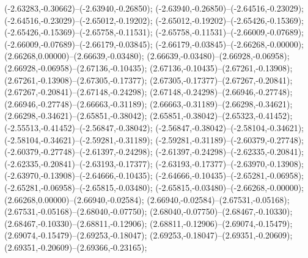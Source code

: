  (-2.63283,-0.30662)--(-2.63940,-0.26850);
 (-2.63940,-0.26850)--(-2.64516,-0.23029);
 (-2.64516,-0.23029)--(-2.65012,-0.19202);
 (-2.65012,-0.19202)--(-2.65426,-0.15369);
 (-2.65426,-0.15369)--(-2.65758,-0.11531);
 (-2.65758,-0.11531)--(-2.66009,-0.07689);
 (-2.66009,-0.07689)--(-2.66179,-0.03845);
 (-2.66179,-0.03845)--(-2.66268,-0.00000);
 (2.66268,0.00000)--(2.66639,-0.03480);
 (2.66639,-0.03480)--(2.66928,-0.06958);
 (2.66928,-0.06958)--(2.67136,-0.10435);
 (2.67136,-0.10435)--(2.67261,-0.13908);
 (2.67261,-0.13908)--(2.67305,-0.17377);
 (2.67305,-0.17377)--(2.67267,-0.20841);
 (2.67267,-0.20841)--(2.67148,-0.24298);
 (2.67148,-0.24298)--(2.66946,-0.27748);
 (2.66946,-0.27748)--(2.66663,-0.31189);
 (2.66663,-0.31189)--(2.66298,-0.34621);
 (2.66298,-0.34621)--(2.65851,-0.38042);
 (2.65851,-0.38042)--(2.65323,-0.41452);
 (-2.55513,-0.41452)--(-2.56847,-0.38042);
 (-2.56847,-0.38042)--(-2.58104,-0.34621);
 (-2.58104,-0.34621)--(-2.59281,-0.31189);
 (-2.59281,-0.31189)--(-2.60379,-0.27748);
 (-2.60379,-0.27748)--(-2.61397,-0.24298);
 (-2.61397,-0.24298)--(-2.62335,-0.20841);
 (-2.62335,-0.20841)--(-2.63193,-0.17377);
 (-2.63193,-0.17377)--(-2.63970,-0.13908);
 (-2.63970,-0.13908)--(-2.64666,-0.10435);
 (-2.64666,-0.10435)--(-2.65281,-0.06958);
 (-2.65281,-0.06958)--(-2.65815,-0.03480);
 (-2.65815,-0.03480)--(-2.66268,-0.00000);
 (2.66268,0.00000)--(2.66940,-0.02584);
 (2.66940,-0.02584)--(2.67531,-0.05168);
 (2.67531,-0.05168)--(2.68040,-0.07750);
 (2.68040,-0.07750)--(2.68467,-0.10330);
 (2.68467,-0.10330)--(2.68811,-0.12906);
 (2.68811,-0.12906)--(2.69074,-0.15479);
 (2.69074,-0.15479)--(2.69253,-0.18047);
 (2.69253,-0.18047)--(2.69351,-0.20609);
 (2.69351,-0.20609)--(2.69366,-0.23165);

